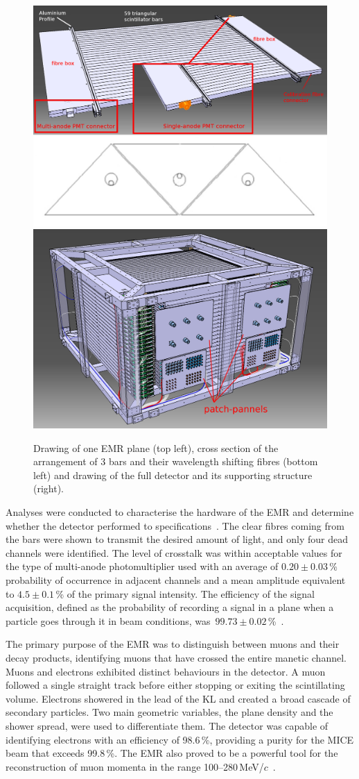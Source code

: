 \begin{figure}[htb!]
	\begin{center}
		\includegraphics[width=0.465\columnwidth]{EMR1.png}
		\hfill
		\includegraphics[width=0.515\columnwidth]{EMR2.jpg}
		\caption{Drawing of one EMR plane (top left), cross section of the arrangement of 3 bars and their wavelength shifting fibres (bottom left) and drawing of the full detector and its supporting structure (right).}
		\label{fig:EMR}
	\end{center}
\end{figure}

Analyses were conducted to characterise the hardware of the EMR and determine whether the detector performed to specifications~\cite{Drielsma:2017doj}. The clear fibres coming from the bars were shown to transmit the desired amount of light, and only four dead channels were identified. The level of crosstalk was within acceptable values for the type of multi-anode photomultiplier used with an average of $0.20\pm0.03$\,\% probability of occurrence in adjacent channels and a mean amplitude equivalent to $4.5\pm0.1$\,\% of the primary signal intensity. The efficiency of the signal acquisition, defined as the probability of recording a signal in a plane when a particle goes through it in beam conditions, was~$99.73\pm0.02$\,\%~\cite{2016JInst..11T10007}.

The primary purpose of the EMR was to distinguish between muons and their decay products, identifying muons that have crossed the entire manetic channel. Muons and electrons exhibited distinct behaviours in the detector. A muon followed a single straight track before either stopping or exiting the scintillating volume. Electrons showered in the lead of the KL and created a broad cascade of secondary particles. Two main geometric variables, the plane density and the shower spread, were used to differentiate them. The detector was capable of identifying electrons with an efficiency of 98.6\,\%, providing a purity for the MICE beam that exceeds 99.8\,\%. The EMR also proved to be a powerful tool for the reconstruction of muon momenta in the range 100--280\,MeV/$c$~\cite{2015JInst..10P2012A}.

